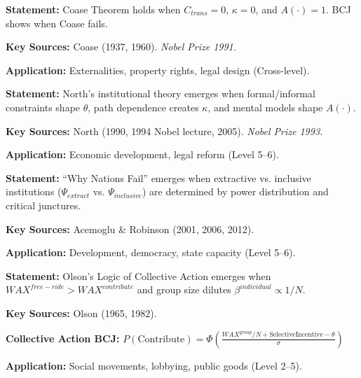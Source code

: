 \begin{tcolorbox}[colback=gray!5!white, colframe=gray!75!black,
    title=Theorem BCJ-T56: Coase Theorem as Special Case]
\textbf{Statement:} Coase Theorem holds when $C_{trans} = 0$, $\kappa = 0$, and $A(\cdot) = 1$. BCJ shows when Coase fails.

\textbf{Key Sources:} Coase (1937, 1960). \textit{Nobel Prize 1991.}

\textbf{Application:} Externalities, property rights, legal design (Cross-level).
\end{tcolorbox}

\begin{tcolorbox}[colback=gray!5!white, colframe=gray!75!black,
    title=Theorem BCJ-T57: North Institutions as Special Case]
\textbf{Statement:} North's institutional theory emerges when formal/informal constraints shape $\theta$, path dependence creates $\kappa$, and mental models shape $A(\cdot)$.

\textbf{Key Sources:} North (1990, 1994 Nobel lecture, 2005). \textit{Nobel Prize 1993.}

\textbf{Application:} Economic development, legal reform (Level 5--6).
\end{tcolorbox}

\begin{tcolorbox}[colback=gray!5!white, colframe=gray!75!black,
    title=Theorem BCJ-T58: Acemoglu-Robinson Institutions as Special Case]
\textbf{Statement:} ``Why Nations Fail'' emerges when extractive vs. inclusive institutions ($\Psi_{extract}$ vs. $\Psi_{inclusive}$) are determined by power distribution and critical junctures.

\textbf{Key Sources:} Acemoglu \& Robinson (2001, 2006, 2012).

\textbf{Application:} Development, democracy, state capacity (Level 5--6).
\end{tcolorbox}

\begin{tcolorbox}[colback=gray!5!white, colframe=gray!75!black,
    title=Theorem BCJ-T59: Olson Collective Action as Special Case]
\textbf{Statement:} Olson's Logic of Collective Action emerges when $WAX^{free-ride} > WAX^{contribute}$ and group size dilutes $\beta^{individual} \propto 1/N$.

\textbf{Key Sources:} Olson (1965, 1982).

\textbf{Collective Action BCJ:} $P(\text{Contribute}) = \Phi\left(\frac{WAX^{group}/N + \text{SelectiveIncentive} - \theta}{\sigma}\right)$

\textbf{Application:} Social movements, lobbying, public goods (Level 2--5).
\end{tcolorbox}

